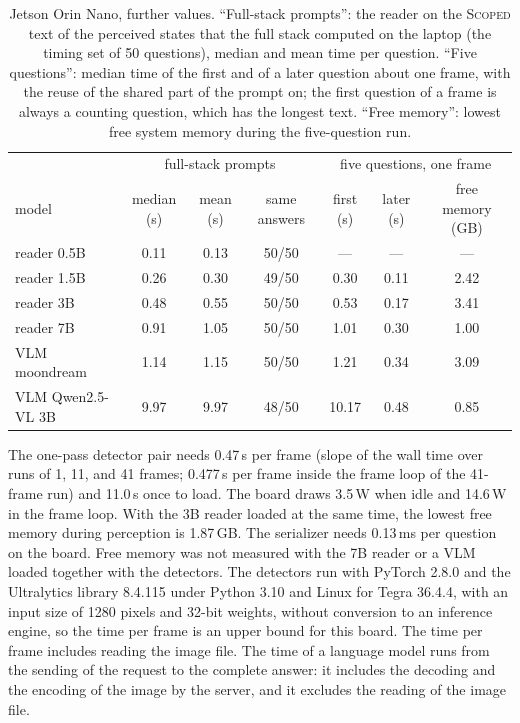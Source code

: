 \documentclass[10pt]{article}
\renewcommand{\thetable}{S\arabic{table}}
\newcommand{\settab}[1]{\setcounter{table}{#1}\addtocounter{table}{-1}\renewcommand{\thetable}{S\arabic{table}}}
\begin{document}
\settab{8}\begin{table}[h]\centering\footnotesize
\caption{Jetson Orin Nano, further values. ``Full-stack prompts'': the reader on the \textsc{Scoped} text of the perceived states that the full stack computed on the laptop (the timing set of 50 questions), median and mean time per question. ``Five questions'': median time of the first and of a later question about one frame, with the reuse of the shared part of the prompt on; the first question of a frame is always a counting question, which has the longest text. ``Free memory'': lowest free system memory during the five-question run.}\label{tab:s8}
\begin{tabular}{@{}lcccccc@{}}
\toprule
 & \multicolumn{3}{c}{full-stack prompts} & \multicolumn{3}{c}{five questions, one frame} \\
model & median (s) & mean (s) & same answers & first (s) & later (s) & free memory (GB) \\ \midrule
reader 0.5B & 0.11 & 0.13 & 50/50 & --- & --- & --- \\
reader 1.5B & 0.26 & 0.30 & 49/50 & 0.30 & 0.11 & 2.42 \\
reader 3B & 0.48 & 0.55 & 50/50 & 0.53 & 0.17 & 3.41 \\
reader 7B & 0.91 & 1.05 & 50/50 & 1.01 & 0.30 & 1.00 \\
VLM moondream & 1.14 & 1.15 & 50/50 & 1.21 & 0.34 & 3.09 \\
VLM Qwen2.5-VL 3B & 9.97 & 9.97 & 48/50 & 10.17 & 0.48 & 0.85 \\
\bottomrule
\end{tabular}
\end{table}

The one-pass detector pair needs 0.47\,s per frame (slope of the wall time over runs of 1, 11, and 41 frames; 0.477\,s per frame inside the frame loop of the 41-frame run) and 11.0\,s once to load. The board draws 3.5\,W when idle and 14.6\,W in the frame loop. With the 3B reader loaded at the same time, the lowest free memory during perception is 1.87\,GB. The serializer needs 0.13\,ms per question on the board. Free memory was not measured with the 7B reader or a VLM loaded together with the detectors. The detectors run with PyTorch 2.8.0 and the Ultralytics library 8.4.115 under Python 3.10 and Linux for Tegra 36.4.4, with an input size of 1280 pixels and 32-bit weights, without conversion to an inference engine, so the time per frame is an upper bound for this board. The time per frame includes reading the image file. The time of a language model runs from the sending of the request to the complete answer: it includes the decoding and the encoding of the image by the server, and it excludes the reading of the image file.
\end{document}
